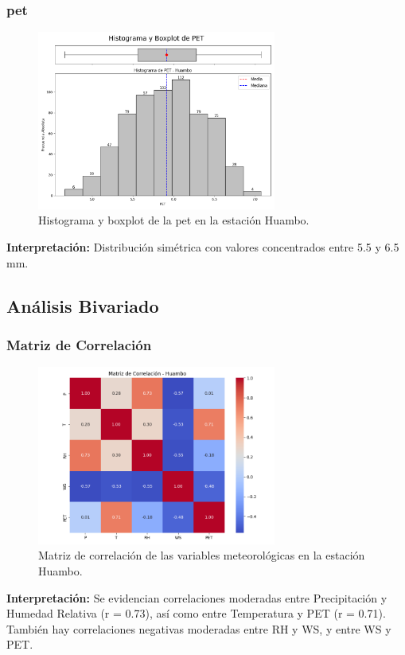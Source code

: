 \subsubsection*{\gls{pet} }
\begin{figure}[htbp]
\centering
\includegraphics[width=0.7\textwidth]{resultados/por_estacion_meteorologica/Huambo/PET_histograma.png}
\caption{Histograma y boxplot de la \gls{pet}  en la estación Huambo.}
\label{fig:huambo_PET}
\end{figure}
\textbf{Interpretación:} Distribución simétrica con valores concentrados entre 5.5 y 6.5 mm.

\subsection{Análisis Bivariado}

\subsubsection*{Matriz de Correlación}
\begin{figure}[htbp]
\centering
\includegraphics[width=0.7\textwidth]{resultados/por_estacion_meteorologica/Huambo/matriz_correlacion.png}
\caption{Matriz de correlación de las variables meteorológicas en la estación Huambo.}
\label{fig:huambo_corr}
\end{figure}
\textbf{Interpretación:} Se evidencian correlaciones moderadas entre Precipitación y Humedad Relativa (r = 0.73), así como entre Temperatura y PET (r = 0.71). También hay correlaciones negativas moderadas entre RH y WS, y entre WS y PET.

